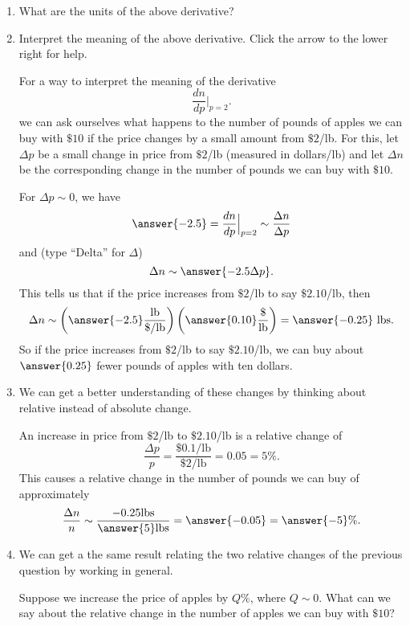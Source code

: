 \documentclass{ximera}
\begin{document}
\begin{question}
\begin{enumerate}
\item What are the units of the above derivative?

\item Interpret the meaning of the above derivative. Click the arrow to the lower right for help.

\begin{expandable}

For a way to interpret the meaning of the derivative 
\[
         \frac{dn}{dp} \Big|_{p=2} . 
\]
we can ask ourselves what happens to the number of pounds of apples we can buy with $\$10$ if the price changes by a small amount from $\$2$/lb. For this, let $\Delta p$ be a small change in price from $\$2$/lb (measured in dollars/lb) and let $\Delta n$ be the corresponding change in the number of pounds we can buy with $\$10$.

For $\Delta p \sim 0$, we have
\[
    \answer{-2.5} =  \frac{dn}{dp} \Big|_{p=2} \sim \frac{\Delta n}{\Delta p} 
\]
and (type ``Delta'' for $\Delta$)
\[
     \Delta n \sim   \answer{-2.5 \Delta p}.
\]
This tells us that if the price increases from $\$2$/lb to say $\$2.10$/lb, then 
\[
   \Delta n \sim \left( \answer{-2.5} \frac{\text{lb}}{\$/\text{lb}} \right) \left( \answer{0.10} \frac{\$}{\text{lb}}  \right) =                        \answer{-0.25}\text{ lbs}.
\]
So if the price increases from $\$2$/lb to say $\$2.10$/lb, we can buy about $\answer{0.25}$ fewer pounds of apples with ten dollars. 

\end{expandable}

\item We can get a better understanding of these changes by thinking about relative instead of absolute change.

An increase in price from $\$2$/lb to $\$2.10$/lb is a relative change of
\[
    \frac{\Delta p}{p} = \frac{\$0.1/\text{lb}}{\$ 2/\text{lb}} = 0.05 = 5\% .
\]
This causes a relative change in the number of pounds we can buy of approximately
\[
    \frac{\Delta n}{n} \sim \frac{-0.25 \text{lbs}}{\answer{5}\text{lbs}} = \answer{-0.05} = \answer{-5}\%.
\]
 
\item We can get a the same result relating the two relative changes of the previous question by working in general. 

Suppose we increase the price of apples by $Q\%$, where $Q\sim 0$. What can we say about the relative change in the number of apples we can buy with $\$10$?


\end{enumerate}
\end{question}
\end{document}
